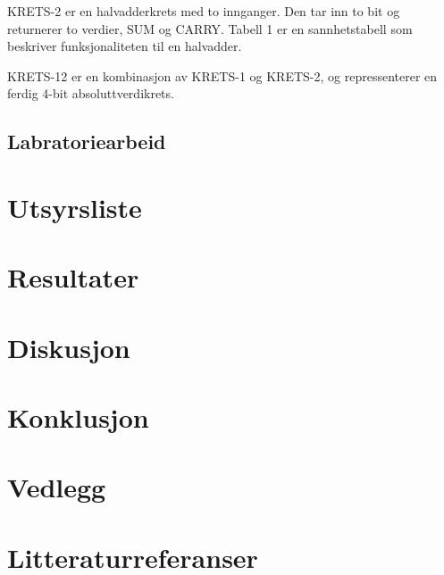 \documentclass{article}
\begin{document}
KRETS-2 er en halvadderkrets med to innganger. Den tar inn to bit og returnerer to verdier, SUM og CARRY. Tabell 1 er en sannhetstabell som beskriver funksjonaliteten til en halvadder.

KRETS-12 er en kombinasjon av KRETS-1 og KRETS-2, og repressenterer en ferdig 4-bit absoluttverdikrets.

\subsection{Labratoriearbeid}









\section{Utsyrsliste}

\section{Resultater}

\section{Diskusjon}

\section{Konklusjon}

\section{Vedlegg}

\section{Litteraturreferanser}
\end{document}
